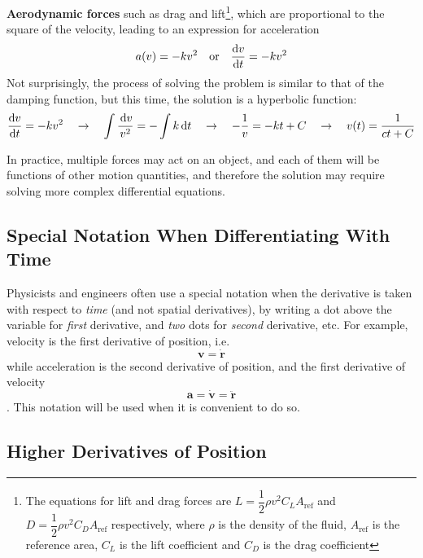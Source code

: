 \textbf{Aerodynamic forces} such as drag and lift\footnote{The equations
for lift and drag forces are $L=\dfrac12\rho v^2C_LA_\text{ref}$ and
$D=\dfrac12\rho v^2C_DA_\text{ref}$ respectively, where $\rho$ is the density
of the fluid, $A_\text{ref}$ is the reference area, $C_L$ is the lift
coefficient and $C_D$ is the drag coefficient}, which are proportional
to the square of the velocity, leading to an expression for acceleration 
\begin{equation*}
  a(v)=-kv^2\quad\text{or}\quad \diff vt=-kv^2
\end{equation*}
Not surprisingly, the process of solving the problem is similar to that of
the damping function, but this time, the solution is a hyperbolic function:
\begin{equation*}
  \diff vt=-kv^2\quad\rightarrow\quad \int\frac{\dl v}{v^2}=-\int k\dl t
  \quad\rightarrow\quad -\frac1v=-kt+C
  \quad\rightarrow\quad v(t)=\frac{1}{ct+C}
\end{equation*}

In practice, multiple forces may act on an object, and each of them will be
functions of other motion quantities, and therefore the solution may require
solving more complex differential equations.




\subsection{Special Notation When Differentiating With Time}

Physicists and engineers often use a special notation when the derivative is
taken with respect to \emph{time} (and not spatial derivatives), by writing a
dot above the variable for \emph{first} derivative, and \emph{two} dots for
\emph{second} derivative, etc. For example, velocity is the first derivative
of position, i.e.\
\begin{equation*}
  \bm v=\dot{\bm r}
\end{equation*}
while acceleration is the second derivative of position, and the first
derivative of velocity
\begin{equation*}
  \bm a = \dot{\bm v}=\ddot{\bm r}
\end{equation*}.
This notation will be used when it is convenient to do so.


\subsection{Higher Derivatives of Position}

